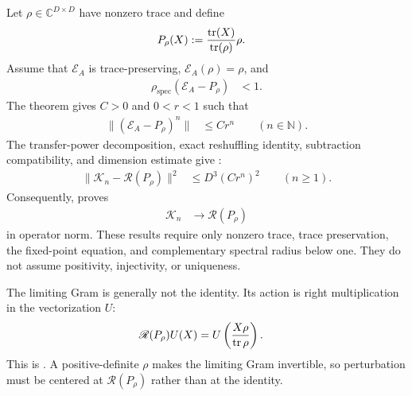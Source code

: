 \documentclass{article}
\begin{document}
Let $\rho\in\mathbb C^{D\times D}$ have nonzero trace and define
\begin{align}
    P_\rho(X)
     & :=
    \frac{\operatorname{tr}(X)}{\operatorname{tr}(\rho)}\rho.
    \label{eq:cpgsv21_martingale_overlap_fixed_point_projection}
\end{align}
Assume that $\mathcal E_A$ is trace-preserving,
$\mathcal E_A(\rho)=\rho$, and
\begin{align}
    \rho_{\mathrm{spec}}(\mathcal E_A-P_\rho)
     & <1.
    \label{eq:cpgsv21_martingale_overlap_complement_spectral_radius}
\end{align}
The theorem  gives
$C>0$ and $0<r<1$ such that
\begin{align}
    \lVert(\mathcal E_A-P_\rho)^n\rVert
     & \leq Cr^n
    \qquad(n\in\mathbb N).
    \label{eq:cpgsv21_martingale_overlap_geometric_transfer_bound}
\end{align}
The transfer-power decomposition, exact reshuffling identity, subtraction
compatibility, and dimension estimate give
:
\begin{align}
    \lVert\mathcal K_n-\mathscr R(P_\rho)\rVert^2
     & \leq D^3(Cr^n)^2
    \qquad(n\geq1).
    \label{eq:cpgsv21_martingale_overlap_gram_geometric_bound}
\end{align}
Consequently,
 proves
\begin{align}
    \mathcal K_n
     & \longrightarrow\mathscr R(P_\rho)
    \label{eq:cpgsv21_martingale_overlap_gram_limit}
\end{align}
in operator norm. These results require only nonzero trace, trace preservation,
the fixed-point equation, and complementary spectral radius below one. They do
not assume positivity, injectivity, or uniqueness.

The limiting Gram is generally not the identity. Its action is right
multiplication in the vectorization $U$:
\begin{align}
    \mathscr R(P_\rho)U(X)
     & =
    U\left(\frac{X\rho}{\operatorname{tr}\rho}\right).
    \label{eq:cpgsv21_martingale_overlap_limiting_gram_action}
\end{align}
This is
.
A positive-definite $\rho$ makes the limiting Gram invertible, so perturbation
must be centered at $\mathscr R(P_\rho)$ rather than at the identity.
\end{document}
